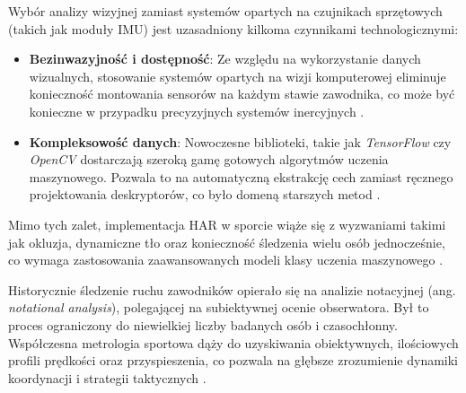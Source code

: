         Wybór analizy wizyjnej zamiast systemów opartych na czujnikach sprzętowych (takich jak moduły IMU) jest uzasadniony kilkoma czynnikami technologicznymi:
        \begin{itemize}
            \item \textbf{Bezinwazyjność i dostępność}: Ze względu na wykorzystanie danych wizualnych, stosowanie systemów opartych na wizji komputerowej eliminuje konieczność montowania sensorów na każdym stawie zawodnika, co może być konieczne w przypadku precyzyjnych systemów inercyjnych \cite{host2022overview}.
            \item \textbf{Kompleksowość danych}: Nowoczesne biblioteki, takie jak \textit{TensorFlow} czy \textit{OpenCV} dostarczają szeroką gamę gotowych algorytmów uczenia maszynowego. Pozwala to na automatyczną ekstrakcję cech zamiast ręcznego projektowania deskryptorów, co było domeną starszych metod \cite{host2022overview}.
        \end{itemize}

        Mimo tych zalet, implementacja HAR w sporcie wiąże się z wyzwaniami takimi jak okluzja, dynamiczne tło oraz konieczność śledzenia wielu osób jednocześnie, co wymaga zastosowania zaawansowanych modeli klasy uczenia maszynowego \cite{host2022overview}.

        Historycznie śledzenie ruchu zawodników opierało się na analizie notacyjnej (ang. \textit{notational analysis}), polegającej na subiektywnej ocenie obserwatora. Był to proces ograniczony do niewielkiej liczby badanych osób i czasochłonny. Współczesna metrologia sportowa dąży do uzyskiwania obiektywnych, ilościowych profili prędkości oraz przyspieszenia, co pozwala na głębsze zrozumienie dynamiki koordynacji i strategii taktycznych \cite{barris2008review}.

